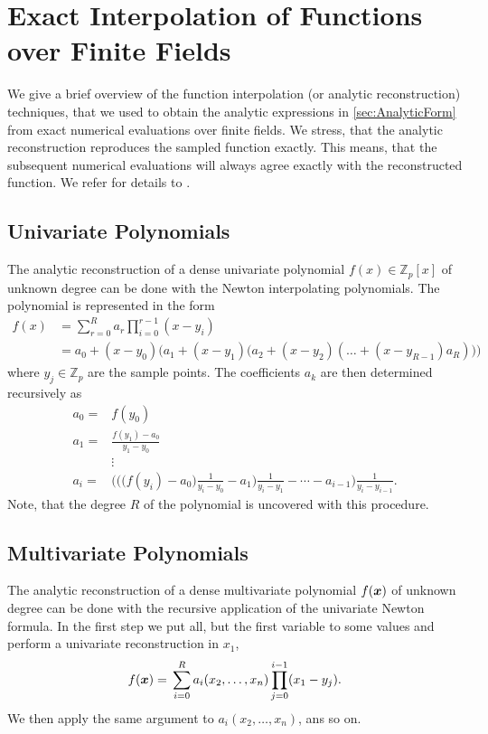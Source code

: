 \section{Exact Interpolation of Functions over Finite Fields}
\label{sec:func_reconstruction}
{
\newcommand{\nn}{\\}
We give a brief overview of the function interpolation (or analytic reconstruction) techniques, that we used to obtain the analytic expressions in \cref{sec:AnalyticForm} from exact numerical evaluations over finite fields.
We stress, that the analytic reconstruction reproduces the sampled function exactly.
This means, that the subsequent numerical evaluations will always agree exactly with the reconstructed function.
We refer for details to \cite{Klappert:2019emp,Peraro:2016wsq,Peraro:2019svx}.

\subsection{Univariate Polynomials}
\label{sec:newton}

The analytic reconstruction of a dense univariate polynomial $f(x) \in \mathbb{Z}_p[x]$ of unknown degree can be done with the Newton interpolating polynomials.
The polynomial is represented in the form
\begin{align*}
  f(x)    &= \sum_{r=0}^Ra_r\prod_{i=0}^{r-1}(x-y_i) \\
  &= a_0 + (x-y_0) 
  \Bigg( 
  a_1 + (x-y_1) 
  \Big( 
  a_2 + (x-y_2) (\dots + (x-y_{R-1})a_R)
  \Big)
  \Bigg)
\end{align*}
where $y_{j} \in \mathbb{Z}_p$ are the sample points.
The coefficients $a_k$ are then determined recursively as 
\begin{align*} %
  a_0 ={}& f(y_0) \nn
  a_1 = {} & \frac{f(y_1)-a_0}{y_1-y_0} \nn
  & \vdots  \\
  a_i = {} & \Bigg(\Big(\big(f(y_i)-a_0\big) \frac{1}{y_i-y_0}-a_1\Big) \frac{1}{y_i-y_1}-\cdots - a_{i-1} \Bigg) \frac{1}{y_i-y_{i-1}}.
\end{align*}
Note, that the degree $R$ of the polynomial is uncovered with this procedure.

\subsection{Multivariate Polynomials}
\label{sec:newton_rec}

The analytic reconstruction of a dense multivariate polynomial $f(\vb*{x})$ of unknown degree can be done with the recursive application of the univariate Newton formula.
In the first step we put all, but the first variable to some values and perform a univariate reconstruction in $x_1$,
\begin{equation} %
  f(\vb*{x}) ={} \sum_{i=0}^R a_i(x_2,\ldots,x_n) \prod_{j=0}^{i-1} (x_1-y_j).
\end{equation}
We then apply the same argument to $a_i(x_2,\ldots,x_n)$, ans so on.

}
